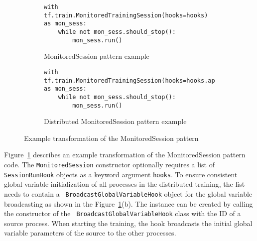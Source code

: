 \begin{figure}[ht!]
  \centering
  \begin{subfigure}[t]{0.45\textwidth}
    \begin{lstlisting}[style=mpython]
with tf.train.MonitoredTrainingSession(hooks=hooks) as mon_sess:
    while not mon_sess.should_stop():
        mon_sess.run()\end{lstlisting}
    \caption{MonitoredSession pattern example}
  \end{subfigure}
  \hspace{5mm}
  \begin{subfigure}[t]{0.45\textwidth}
    \begin{lstlisting}[style=mpython]
with tf.train.MonitoredTrainingSession(hooks=hooks.append(hvd.BroadcastGlobalVariablesHook(0)) as mon_sess:
    while not mon_sess.should_stop():
        mon_sess.run()\end{lstlisting}
    \caption{Distributed MonitoredSession pattern example}
  \end{subfigure}
  \caption{Example transformation of the MonitoredSession pattern}
  \label{fig:trans:monsesstrans}
\end{figure}


Figure~\ref{fig:trans:monsesstrans} describes an example transformation of the
MonitoredSession pattern code.
The {\tt MonitoredSession} constructor optionally requires a list of {\tt
SessionRunHook} objects as a keyword argument {\tt hooks}.
To ensure consistent global variable initialization of all processes in the
distributed training, the list needs to contain a {\tt
BroadcastGlobalVariableHook} object for the global variable broadcasting as
shown in the Figure~\ref{fig:trans:monsesstrans}(b).
The instance can be created by calling the constructor of the {\tt
BroadcastGlobalVariableHook} class with the ID of a source process.  
When starting the training, the hook broadcasts the initial global variable
parameters of the source to the other processes.

\vspace{-1em}

